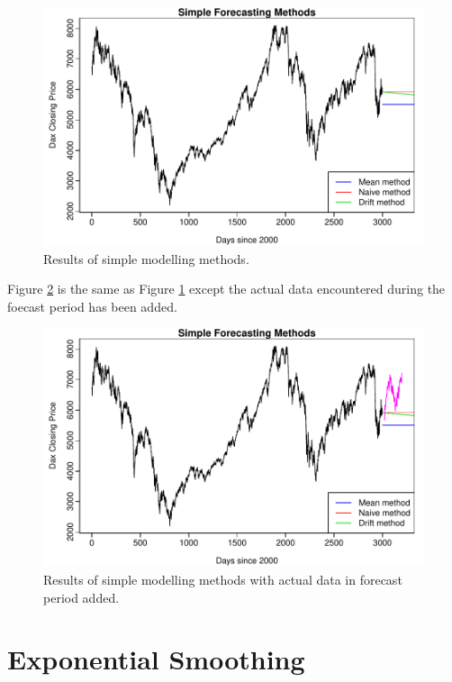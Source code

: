 \begin{figure}[tbh]
\centering
\includegraphics{Figures/chp_ts_dax1}
\caption[Results of simple modelling methods.]{Results of simple modelling methods.}
\label{fig:chp5_ts_dax}
\end{figure}

Figure \ref{fig:chp5_ts_dax_act} is the same as Figure \ref{fig:chp5_ts_dax} except the actual data encountered during the foecast period has been added.

\begin{figure}[tbh]
\centering
\includegraphics{Figures/chp_ts_dax1_plus_act_data}
\caption[Results of simple modelling methods and actual data.]{Results of simple modelling methods with actual data in forecast period added.}
\label{fig:chp5_ts_dax_act}
\end{figure}

\section{Exponential Smoothing}

